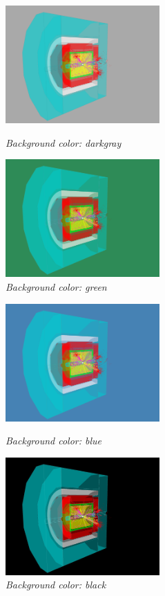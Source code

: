 \documentclass[a4paper,10pt]{article}
\begin{document}
\begin{figure}[h]
\begin{minipage}[t]{6cm}
\centerline{\includegraphics[height=4.5cm]{bg_color_dackgray1.png}}
\caption{\label{CEDViewer} \textsl{Background color: darkgray}}
\end{minipage}
\hfill
\begin{minipage}[t]{6cm}
\setlength{\fboxsep}{0mm}
\centerline{\includegraphics[height=4.5cm]{bg_color_green1.png}}
\caption{\label{DSTViewer}\textsl{Background color: green}}
\end{minipage}
\end{figure}

\begin{figure}[h]
\begin{minipage}[t]{6cm}
\centerline{\includegraphics[height=4.5cm]{bg_color_blue1.png}}
\caption{\label{CEDViewer} \textsl{Background color: blue}}
\end{minipage}
\hfill
\begin{minipage}[t]{6cm}
\setlength{\fboxsep}{0mm}
\centerline{\includegraphics[height=4.5cm]{bg_color_black1.png}}
\caption{\label{User viewer}\textsl{Background color: black}}
\end{minipage}
\end{figure}
\end{document}
